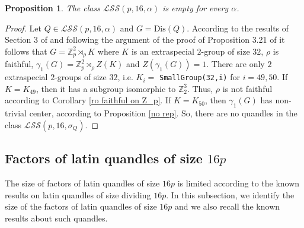 \documentclass[a4paper, english, 9pt]{amsart}
\theoremstyle{plain}
\newtheorem{proposition}[theorem]{Proposition}
\theoremstyle{definition}
\def\dis{\mathrm{Dis}}
\def\comment#1{{\color{red} #1}}
\def\Z{\mathbb Z}
\def\LSS{\mathcal{LSS}}
\begin{document}
\begin{proposition}\label{no LSS}
    The class $\LSS(p,16,\alpha)$ is empty for every $\alpha$.
\end{proposition}


\begin{proof}
  Let $Q\in \LSS(p,16,\alpha)$ and $G=\dis(Q)$.  According to the results of Section 3 of \cite{LSS} and following the argument of the proof of Proposition 3.21 of \cite{LSS} it follows that $G=\Z_p^2\rtimes_\rho K$ where $K$ is an extraspecial $2$-group of size $32$, $\rho$ is faithful, $\gamma_1(G)= \Z_p^2\rtimes_\rho Z(K)$ and $Z(\gamma_1(G))=1$. There are only $2$ extraspecial $2$-groups of size $32$, i.e. $K_i=$ \texttt{SmallGroup(32,i)} for $i=49,50$. If $K=K_{49}$, then it has a subgroup isomorphic to $\Z_2^3$. Thus, $\rho$ is not faithful according to Corollary \ref{ro faithful on Z_p}. If $K=K_{50}$, then $\gamma_1(G)$ has non-trivial center, according to Proposition \ref{no rep}. So, there are no quandles in the class $\LSS(p,16,\sigma_Q)$.
\end{proof}



\subsection{Factors of latin quandles of size \texorpdfstring{$16p$}{16p}}

The size of factors of latin quandles of size $16p$ is limited according to the known results on latin quandles of size dividing $16p$. In this subsection, we identify the size of the factors of latin quandles of size $16p$ and we also recall the known results about such quandles.
\end{document}
